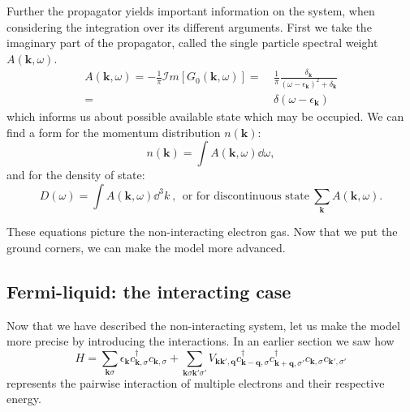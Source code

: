 \documentclass[../main.tex]{subfile}
\begin{document}
Further the propagator yields important information on the system, when considering the integration over its different arguments. First we take the imaginary 
part of the propagator, called the single particle spectral weight $A(\bm{k}, \omega)$.
\begin{equation}
    \begin{aligned}\label{eq:SingleParticleSpectralWeight}
        A(\bm{k}, \omega) = -\frac{1}{\pi} \mathcal{I}m \left[G_0(\bm{k}, \omega)\right] =~& \frac{1}{\pi} \frac{\delta_{\bm{k}}}{(\omega- \epsilon_{\bm{k}})^2 + \delta_{\bm{k}}}\\
        =~&\delta(\omega- \epsilon_{\bm{k}})
    \end{aligned}
\end{equation}
which informs us about possible available state which may be occupied. We can find a form for the momentum distribution $n(\bm{k})$:
\begin{equation}
    n(\bm{k}) = \int A(\bm{k},\omega) \dd \omega,\label{eq:MomentumDistribution}
\end{equation}
and for the density of state:
\begin{equation}\label{eq:DensityOfState}
    D(\omega) = \int A(\bm{k},\omega) \dd ^3 k~,~~ \text{or for discontinuous state}~ \sum_{\bm{k}} A(\bm{k}, \omega).
\end{equation}

These equations picture the non-interacting electron gas. Now that we put the ground corners, we can make the model more advanced.

\subsection{Fermi-liquid: the interacting case}
Now that we have described the non-interacting system, let us make the model more precise by introducing the interactions.
In an earlier section we saw how
\begin{equation} \label{eq:FermiLiquid_Hamiltonian}
    H = \sum_{\bm{k}\sigma} \epsilon_{\bm{k}} c_{\bm{k},\sigma}^{\dagger}c_{\bm{k},\sigma} + \sum_{\bm{k}\sigma\bm{k}'\sigma'}
        V_{\bm{k}\bm{k}', \bm{q}} c_{\bm{k}-\bm{q},\sigma}^{\dagger}c_{\bm{k}+\bm{q},\sigma'}^{\dagger}c_{\bm{k},\sigma}c_{\bm{k}',\sigma'}
\end{equation}
represents the pairwise interaction of multiple electrons and their respective energy.\\
\end{document}
